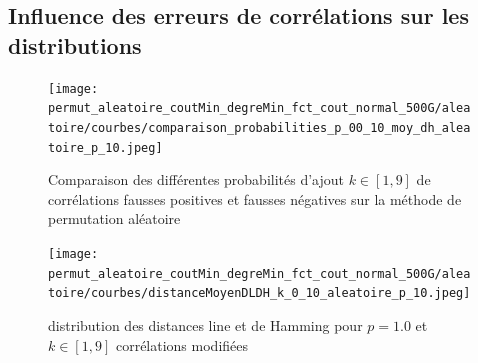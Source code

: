 \documentclass[onecolumn, 12pt]{book}
\begin{document}
\subsection{Influence des erreurs de corr\'elations sur les distributions}
\begin{centering} 
\begin{figure}[htb!] 
\texttt{[image: permut\_aleatoire\_coutMin\_degreMin\_fct\_cout\_normal\_500G/aleatoire/courbes/comparaison\_probabilities\_p\_00\_10\_moy\_dh\_aleatoire\_p\_10.jpeg]}
\caption{ Comparaison des diff\'erentes probabilit\'es d'ajout $k \in [1,9]$ de corr\'elations fausses positives et fausses n\'egatives sur la m\'ethode de permutation al\'eatoire }
\label{compareDifferentesProbabilitesP0_1_fct_cout_unitaire_p05} 
\end{figure}
\end{centering} 

\begin{centering} 
\begin{figure}[htb!] 
\texttt{[image: permut\_aleatoire\_coutMin\_degreMin\_fct\_cout\_normal\_500G/aleatoire/courbes/distanceMoyenDLDH\_k\_0\_10\_aleatoire\_p\_10.jpeg]}
\caption{ distribution des distances line et de Hamming pour $p=1.0$ et $k \in [1,9]$ corr\'elations modifi\'ees}
\label{distributionDLDH_p1.0_k19_fct_cout_unitaire} 
\end{figure}
\end{centering} 
\end{document}
